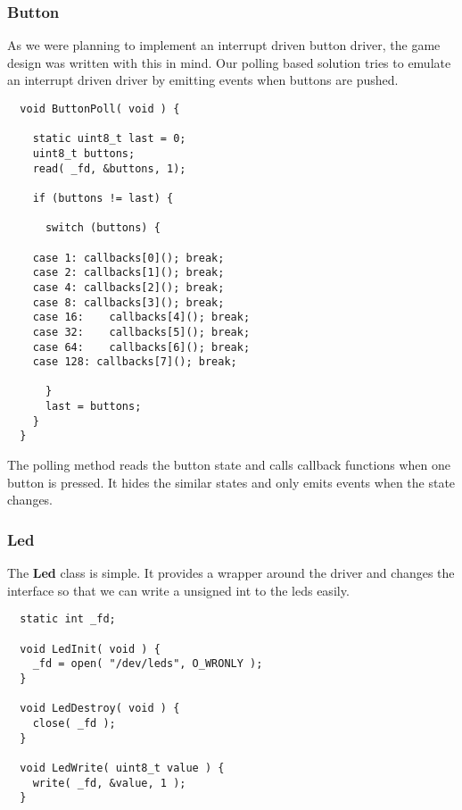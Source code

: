 \subsubsection{Button}
As we were planning to implement an interrupt driven button driver, the game design
was written with this in mind. Our polling based solution tries to emulate an interrupt
driven driver by emitting events when buttons are pushed.

\begin{lstlisting}
  void ButtonPoll( void ) {

    static uint8_t last = 0;
    uint8_t buttons;
    read( _fd, &buttons, 1);

    if (buttons != last) {

      switch (buttons) {

	case 1:	callbacks[0](); break;
	case 2:	callbacks[1](); break;
	case 4:	callbacks[2](); break;
	case 8:	callbacks[3](); break;
	case 16:	callbacks[4](); break;
	case 32:	callbacks[5](); break;
	case 64:	callbacks[6](); break;
	case 128: callbacks[7](); break;

      }
      last = buttons;
    }
  }
\end{lstlisting}
The polling method reads the button state and calls callback functions when one button
is pressed. It hides the similar states and only emits events when the state changes.

\subsubsection{Led}
The {\bf Led} class is simple. It provides a wrapper around the driver and changes the interface
so that we can write a unsigned int to the leds easily.
\begin{lstlisting}
  static int _fd;

  void LedInit( void ) {
    _fd = open( "/dev/leds", O_WRONLY );
  }

  void LedDestroy( void ) {
    close( _fd );
  }

  void LedWrite( uint8_t value ) {
    write( _fd, &value, 1 );
  }
\end{lstlisting}


